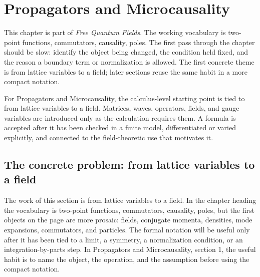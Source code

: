 \chapter{Propagators and Microcausality}


This chapter is part of \emph{Free Quantum Fields}.  The working vocabulary is two-point functions, commutators, causality, poles.  The first pass through the chapter should be slow: identify the object being changed, the condition held fixed, and the reason a boundary term or normalization is allowed.  The first concrete theme is from lattice variables to a field; later sections reuse the same habit in a more compact notation.

For Propagators and Microcausality, the calculus-level starting point is tied to from lattice variables to a field.  Matrices, waves, operators, fields, and gauge variables are introduced only as the calculation requires them.  A formula is accepted after it has been checked in a finite model, differentiated or varied explicitly, and connected to the field-theoretic use that motivates it.

\section{The concrete problem: from lattice variables to a field}













The work of this section is from lattice variables to a field.  In the chapter heading the vocabulary is two-point functions, commutators, causality, poles, but the first objects on the page are more prosaic: fields, conjugate momenta, densities, mode expansions, commutators, and particles.  The formal notation will be useful only after it has been tied to a limit, a symmetry, a normalization condition, or an integration-by-parts step.  In Propagators and Microcausality, section 1, the useful habit is to name the object, the operation, and the assumption before using the compact notation.

